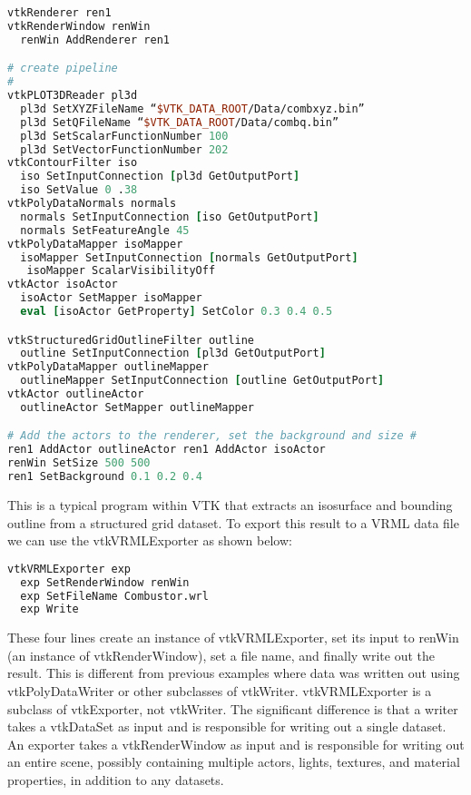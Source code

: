 \begin{lstlisting}[language=TCL, caption={}, numbers=none, frame=none]
vtkRenderer ren1
vtkRenderWindow renWin
  renWin AddRenderer ren1

# create pipeline
#
vtkPLOT3DReader pl3d
  pl3d SetXYZFileName “$VTK_DATA_ROOT/Data/combxyz.bin”
  pl3d SetQFileName “$VTK_DATA_ROOT/Data/combq.bin”
  pl3d SetScalarFunctionNumber 100
  pl3d SetVectorFunctionNumber 202
vtkContourFilter iso
  iso SetInputConnection [pl3d GetOutputPort]
  iso SetValue 0 .38
vtkPolyDataNormals normals
  normals SetInputConnection [iso GetOutputPort]
  normals SetFeatureAngle 45
vtkPolyDataMapper isoMapper
  isoMapper SetInputConnection [normals GetOutputPort]
   isoMapper ScalarVisibilityOff
vtkActor isoActor
  isoActor SetMapper isoMapper
  eval [isoActor GetProperty] SetColor 0.3 0.4 0.5

vtkStructuredGridOutlineFilter outline
  outline SetInputConnection [pl3d GetOutputPort]
vtkPolyDataMapper outlineMapper
  outlineMapper SetInputConnection [outline GetOutputPort]
vtkActor outlineActor
  outlineActor SetMapper outlineMapper

# Add the actors to the renderer, set the background and size #
ren1 AddActor outlineActor ren1 AddActor isoActor
renWin SetSize 500 500
ren1 SetBackground 0.1 0.2 0.4
\end{lstlisting}

This is a typical program within VTK that extracts an isosurface and bounding outline from a structured grid dataset. To export this result to a VRML data file we can use the vtkVRMLExporter as shown below:

\begin{lstlisting}[language=TCL, caption={}, numbers=none, frame=none]
vtkVRMLExporter exp
  exp SetRenderWindow renWin
  exp SetFileName Combustor.wrl
  exp Write
\end{lstlisting}

These four lines create an instance of vtkVRMLExporter, set its input to renWin (an instance of vtkRenderWindow), set a file name, and finally write out the result. This is different from previous examples where data was written out using vtkPolyDataWriter or other subclasses of vtkWriter. vtkVRMLExporter is a subclass of vtkExporter, not vtkWriter. The significant difference is that a writer takes a vtkDataSet as input and is responsible for writing out a single dataset. An exporter takes a vtkRenderWindow as input and is responsible for writing out an entire scene, possibly containing multiple actors, lights, textures, and material properties, in addition to any datasets.

